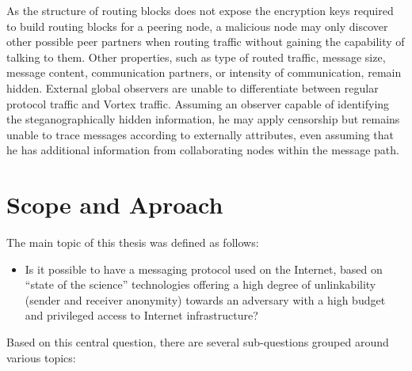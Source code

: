 As the structure of routing blocks does not expose the encryption keys required to build routing blocks for a peering node, a malicious node may only discover other possible peer partners when routing traffic without gaining the capability of talking to them. Other properties, such as type of routed traffic, message size, message content, communication partners, or intensity of communication, remain hidden. External global observers are unable to differentiate between regular protocol traffic and Vortex traffic. Assuming an observer capable of identifying the steganographically hidden information, he may apply censorship but remains unable to trace messages according to externally attributes, even assuming that he has additional information from collaborating nodes within the message path.


\chapter{Scope and Aproach}
The main topic of this thesis was defined as follows:

\begin{itemize}
	\item Is it possible to have a messaging protocol used on the Internet, based on ``state of the science'' technologies offering a high degree of unlinkability (sender and receiver anonymity) towards an adversary with a high budget and privileged access to Internet infrastructure?
\end{itemize}

Based on this central question, there are several sub-questions grouped around various topics:

